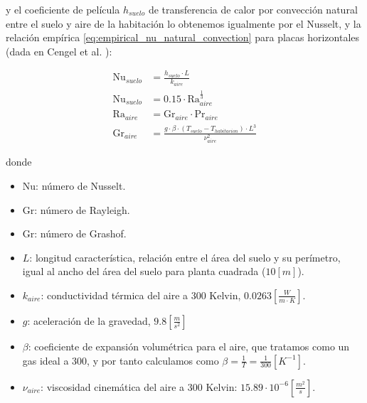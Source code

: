 y el coeficiente de película $h_{suelo}$ de transferencia de calor por
convección natural entre el suelo y aire de la habitación lo obtenemos
igualmente por el Nusselt, y la relación empírica
\eqref{eq:empirical_nu_natural_convection} para placas horizontales (dada en
Cengel et al. \cite{cengel2007transferencia}):

\begin{align}
	\text{Nu}_{suelo} & = \frac{h_{suelo} \cdot L}{k_{aire}}                                                    \\
	\text{Nu}_{suelo} & = 0.15 \cdot \text{Ra}_{aire}^{\frac{1}{3}}  \label{eq:empirical_nu_natural_convection} \\
	\text{Ra}_{aire}  & = \text{Gr}_{aire} \cdot \text{Pr}_{aire}                                               \\
	\text{Gr}_{aire}  & = \frac{g \cdot \beta \cdot ( T_{suelo} - T_{habitacion} ) \cdot L^3}{\nu_{aire}^2}
\end{align}


donde

\begin{itemize}
	\item $\text{Nu}$: número de Nusselt.
	\item $\text{Gr}$: número de Rayleigh.
	\item $\text{Gr}$: número de Grashof.
	\item $L$: longitud característica, relación entre el área del suelo y su
	      perímetro, igual al ancho del área del suelo para planta cuadrada
	      ($10[m]$).
	\item $k_{aire}$: conductividad térmica del aire a 300 Kelvin, $0.0263\left[ \frac{W}{m \cdot K} \right]$.
	\item $g$: aceleración de la gravedad, $9.8\left[\frac{m}{s^2}\right]$
	\item $\beta$: coeficiente de expansión volumétrica para el aire, que
	      tratamos como un gas ideal a 300, y por tanto calculamos como $\beta =
		      \frac{1}{T} = \frac{1}{300} \left[K^{-1}\right]$.
	\item $\nu_{aire}$: viscosidad cinemática del aire a 300 Kelvin: $15.89 \cdot 10^{-6} \left[\frac{m^2}{s}\right]$.
\end{itemize}
